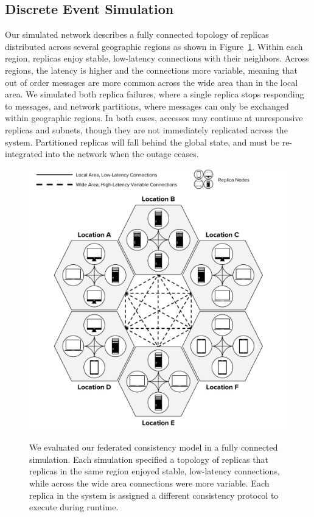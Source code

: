 \subsection{Discrete Event Simulation}
\label{ch04_simulation}

Our simulated network describes a fully connected topology of replicas distributed across several geographic regions as shown in Figure~\ref{fig:ch04_topology.pdf}.
Within each region, replicas enjoy stable, low-latency connections with their neighbors.
Across regions, the latency is higher and the connections more variable, meaning that out of order messages are more common across the wide area than in the local area.
We simulated both replica failures, where a single replica stops responding to messages, and network partitions, where messages can only be exchanged within geographic regions.
In both cases, accesses may continue at unresponsive replicas and subnets, though they are not immediately replicated across the system.
Partitioned replicas will fall behind the global state, and must be re-integrated into the network when the outage ceases.

\begin{figure}
    \begin{center}
        \includegraphics[width=5in]{figures/ch04_topology.pdf}
    \end{center}
    \renewcommand{\baselinestretch}{1}
    \small\normalsize

    \begin{quote}
        \caption[Simulated Federated Network Topology]{We evaluated our federated consistency model in a fully connected simulation. Each simulation specified a topology of replicas that replicas in the same region enjoyed stable, low-latency connections, while across the wide area connections were more variable. Each replica in the system is assigned a different consistency protocol to execute during runtime.}
        \label{fig:ch04_topology.pdf}
    \end{quote}
\end{figure}
\renewcommand{\baselinestretch}{2}
\small\normalsize


